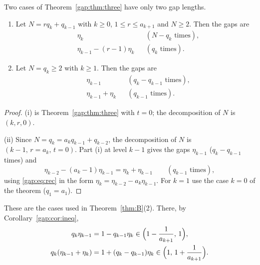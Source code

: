 \begin{corollary}\label{gap:cor:two}
Two cases of Theorem~\ref{gap:thm:three} have only two gap lengths.
\begin{enumerate}
\item[(i)] Let $N=rq_k+q_{k-1}$ with $k\ge0$, $1\le r\le a_{k+1}$ and $N\ge2$. Then the gaps are
\begin{align*}
&\eta_k &&(N-q_k\text{ times}),\\
&\eta_{k-1}-(r-1)\eta_k &&(q_k\text{ times}).
\end{align*}
\item[(ii)] Let $N=q_k\ge2$ with $k\ge1$. Then the gaps are
\begin{align*}
&\eta_{k-1} &&(q_k-q_{k-1}\text{ times}),\\
&\eta_{k-1}+\eta_k &&(q_{k-1}\text{ times}).
\end{align*}
\end{enumerate}
\end{corollary}
\begin{proof}
(i) is Theorem~\ref{gap:thm:three} with $t=0$; the decomposition of $N$ is $(k,r,0)$.

(ii) Since $N=q_k=a_kq_{k-1}+q_{k-2}$, the decomposition of $N$ is $(k-1,\,r=a_k,\,t=0)$. Part (i) at level $k-1$ gives the gaps $\eta_{k-1}$ ($q_k-q_{k-1}$ times) and
\[
\eta_{k-2}-(a_k-1)\eta_{k-1}=\eta_k+\eta_{k-1}\qquad(q_{k-1}\text{ times}),
\]
using \eqref{gap:eq:rec} in the form $\eta_k=\eta_{k-2}-a_k\eta_{k-1}$.
For $k=1$ use the case $k=0$ of the theorem ($q_1=a_1$).
\end{proof}
These are the cases used in Theorem~\ref{thm:B}(2). There, by Corollary~\ref{gap:cor:ineq},
\begin{equation}\label{gap:eq:twoscaled}
\begin{aligned}
q_k\eta_{k-1}&=1-q_{k-1}\eta_k\in\Bigl(1-\frac1{a_{k+1}},\,1\Bigr),\\
q_k(\eta_{k-1}+\eta_k)&=1+(q_k-q_{k-1})\eta_k\in\Bigl(1,\,1+\frac1{a_{k+1}}\Bigr).
\end{aligned}
\end{equation}

